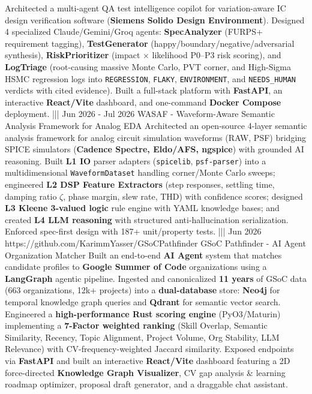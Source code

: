 {    {Architected a multi-agent QA test intelligence copilot for variation-aware IC design verification software (\textbf{Siemens Solido Design Environment}). Designed 4 specialized Claude/Gemini/Groq agents: \textbf{SpecAnalyzer} (FURPS+ requirement tagging), \textbf{TestGenerator} (happy/boundary/negative/adversarial synthesis), \textbf{RiskPrioritizer} (impact $\times$ likelihood P0--P3 risk scoring), and \textbf{LogTriage} (root-causing massive Monte Carlo, PVT corner, and High-Sigma HSMC regression logs into \texttt{REGRESSION}, \texttt{FLAKY}, \texttt{ENVIRONMENT}, and \texttt{NEEDS\_HUMAN} verdicts with cited evidence). Built a full-stack platform with \textbf{FastAPI}, an interactive \textbf{React/Vite} dashboard, and one-command \textbf{Docker Compose} deployment.}%
    |||
    {Jun 2026 - Jul 2026}%
    {}%
    {WASAF - Waveform-Aware Semantic Analysis Framework for Analog EDA}%
    {Architected an open-source 4-layer semantic analysis framework for analog circuit simulation waveforms (RAW, PSF) bridging SPICE simulators (\textbf{Cadence Spectre, Eldo/AFS, ngspice}) with grounded AI reasoning. Built \textbf{L1 IO} parser adapters (\texttt{spicelib}, \texttt{psf-parser}) into a multidimensional \texttt{WaveformDataset} handling corner/Monte Carlo sweeps; engineered \textbf{L2 DSP Feature Extractors} (step responses, settling time, damping ratio $\zeta$, phase margin, slew rate, THD) with confidence scores; designed \textbf{L3 Kleene 3-valued logic} rule engine with YAML knowledge bases; and created \textbf{L4 LLM reasoning} with structured anti-hallucination serialization. Enforced spec-first design with 187+ unit/property tests.}%
    |||
    {Jun 2026}%
    {https://github.com/KarimmYasser/GSoCPathfinder}%
    {GSoC Pathfinder - AI Agent Organization Matcher}%
    {Built an end-to-end \textbf{AI Agent} system that matches candidate profiles to \textbf{Google Summer of Code} organizations using a \textbf{LangGraph} agentic pipeline. Ingested and canonicalized \textbf{11 years} of GSoC data (663 organizations, 12k+ projects) into a \textbf{dual-database} store: \textbf{Neo4j} for temporal knowledge graph queries and \textbf{Qdrant} for semantic vector search. Engineered a \textbf{high-performance Rust scoring engine} (PyO3/Maturin) implementing a \textbf{7-Factor weighted ranking} (Skill Overlap, Semantic Similarity, Recency, Topic Alignment, Project Volume, Org Stability, LLM Relevance) with CV-frequency-weighted Jaccard similarity. Exposed endpoints via \textbf{FastAPI} and built an interactive \textbf{React/Vite} dashboard featuring a 2D force-directed \textbf{Knowledge Graph Visualizer}, CV gap analysis \& learning roadmap optimizer, proposal draft generator, and a draggable chat assistant.}%
}
